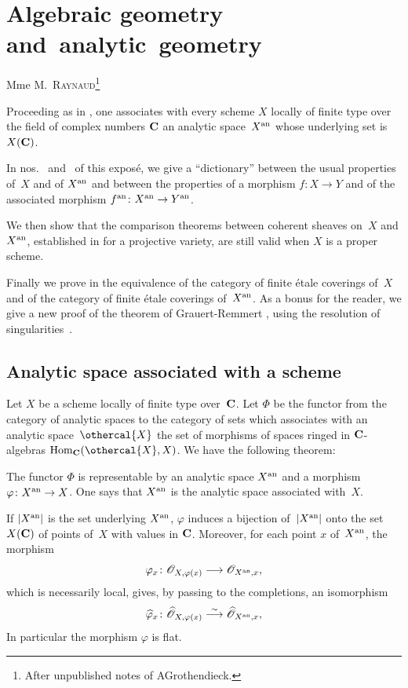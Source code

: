 \chapter{Algebraic geometry and~analytic~geometry}
\label{XII}

\begin{center}
{Mme M.\ \textsc{Raynaud}\footnote{After unpublished notes of
A\ptbl Grothendieck.}}
\end{center}
\vspace*{1cm}

Proceeding as in \cite{XII.10}, one associates with every scheme $X$
locally of finite type over the field of complex numbers $\mathbf{C}$ an
analytic space~$X^{\mathrm{an}}$
whose underlying set is $X(\mathbf{C})$.

In nos.~ and~ of this expos\'e, we give a
``dictionary'' between the usual properties of~$X$ and of
$X^{\mathrm{an}}$ and between the properties of a morphism $f\colon X\to
Y$ and of the associated morphism $f^\an\colon X^\an \to Y^\an$.

We then show that the comparison theorems between
coherent sheaves on~$X$ and $X^{\mathrm{an}}$, established in \cite[]{XII.10} for a projective variety, are still valid when
$X$ is a proper scheme.

Finally we prove in \No {} the equivalence of the category of
finite \'etale coverings of~$X$ and of the category of
finite \'etale coverings of~$X^{\mathrm{an}}$. As a bonus for the reader, we
give a new proof of the theorem of
Grauert-Remmert \cite{XII.6}, using the resolution of
singularities~\cite{XII.8}.

\section{Analytic space associated with a scheme}
\label{XII.1}

Let $X$ be a scheme locally of finite type over~$\mathbf{C}$. Let $\Phi$ be
the functor from the category of analytic spaces \cite[]{XII.4} to
the category of sets which associates with an analytic space~$\othercal{X}$ the set of morphisms of spaces ringed in
$\mathbf{C}$-algebras $\Hom_\CC (\othercal{X},X)$. We have the following
theorem:

\begin{theoremdefinition}
\label{XII.1.1} The functor $\Phi$ is representable by an
analytic space $X^{\mathrm{an}}$ and a morphism $\varphi\colon X^\an\to
X$. One says that $X^{\mathrm{an}}$ is the analytic space associated with~$X$.

If $|X^{\mathrm{an}}|$ is the set underlying $X^{\mathrm{an}}$, $\varphi$
induces a bijection of~$|X^{\mathrm{an}}|$ onto the set $X(\mathbf{C})$ of points
of~$X$ with values in $\mathbf{C}$. Moreover, for each point $x$ of~$X^{\mathrm{an}}$, the morphism
$$
\varphi_x\colon\cal{O}_{X,\varphi(x)}\to\cal{O}_{X^\an,x},
$$
which is necessarily local, gives, by passing to the
completions, an isomorphism
$$
\widehat{\varphi}_x\colon\widehat{\cal{O}}_{X,\varphi(x)}\isomto
\widehat{\cal{O}}_{X^\an,x},
$$
In particular the morphism $\varphi$ is flat.
\end{theoremdefinition}

